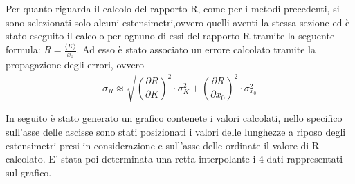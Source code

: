 \documentclass[a4paper,11pt,oneside]{article}
\begin{document}
\begin{figure}[h!]
    \centering
\end{figure}




Per quanto riguarda il calcolo del rapporto R, come per i metodi precedenti, si sono selezionati solo alcuni estensimetri,ovvero quelli aventi la stessa sezione ed è stato eseguito il calcolo per ognuno di essi del rapporto R tramite la seguente formula: $R=\frac{\langle K \rangle}{x_{0}}$. Ad esso è stato associato un errore calcolato tramite la propagazione degli errori, ovvero 
\begin{equation*}
    \sigma_R \approx \sqrt{\left ( \frac{\partial R }{\partial K} \right )^2 \cdot  \sigma_{K}^2 + \left ( \frac{\partial R }{\partial x_0} \right )^2 \cdot \sigma_{x_0}^2 }
\end{equation*}

In seguito è stato generato un grafico contenete i valori calcolati, nello specifico sull'asse delle ascisse sono stati posizionati i valori delle lunghezze a riposo degli estensimetri presi in considerazione e sull'asse delle ordinate il valore di R calcolato. E' stata poi determinata una retta interpolante i 4 dati rappresentati sul grafico.
\end{document}
